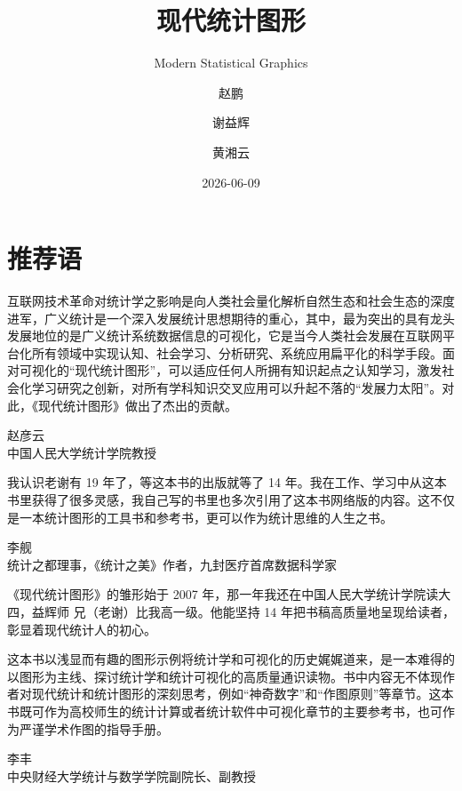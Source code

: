 \documentclass[
  b5paper,
  UTF8,twoside]{book}
\title{现代统计图形}
\subtitle{Modern Statistical Graphics}
\author{赵鹏 \and 谢益辉 \and 黄湘云}
\date{2026-06-09}
\begin{document}
\maketitle

{
\setcounter{tocdepth}{1}
\tableofcontents
}
\listoffigures
\listoftables
\chapter*{推荐语}\label{welcome}

互联网技术革命对统计学之影响是向人类社会量化解析自然生态和社会生态的深度进军，广义统计是一个深入发展统计思想期待的重心，其中，最为突出的具有龙头发展地位的是广义统计系统数据信息的可视化，它是当今人类社会发展在互联网平台化所有领域中实现认知、社会学习、分析研究、系统应用扁平化的科学手段。面对可视化的``现代统计图形''，可以适应任何人所拥有知识起点之认知学习，激发社会化学习研究之创新，对所有学科知识交叉应用可以升起不落的``发展力太阳''。对此，《现代统计图形》做出了杰出的贡献。

\begin{flushright}
赵彦云\\
中国人民大学统计学院教授
\end{flushright}

我认识老谢有 19 年了，等这本书的出版就等了 14 年。我在工作、学习中从这本书里获得了很多灵感，我自己写的书里也多次引用了这本书网络版的内容。这不仅是一本统计图形的工具书和参考书，更可以作为统计思维的人生之书。

\begin{flushright}
李舰\\
统计之都理事，《统计之美》作者，九封医疗首席数据科学家
\end{flushright}

《现代统计图形》的雏形始于 2007 年，那一年我还在中国人民大学统计学院读大四，益辉师
兄（老谢）比我高一级。他能坚持 14 年把书稿高质量地呈现给读者，彰显着现代统计人的初心。

这本书以浅显而有趣的图形示例将统计学和可视化的历史娓娓道来，是一本难得的以图形为主线、探讨统计学和统计可视化的高质量通识读物。书中内容无不体现作者对现代统计和统计图形的深刻思考，例如``神奇数字''和``作图原则''等章节。这本书既可作为高校师生的统计计算或者统计软件中可视化章节的主要参考书，也可作为严谨学术作图的指导手册。

\begin{flushright}
李丰\\
中央财经大学统计与数学学院副院长、副教授
\end{flushright}
\end{document}
